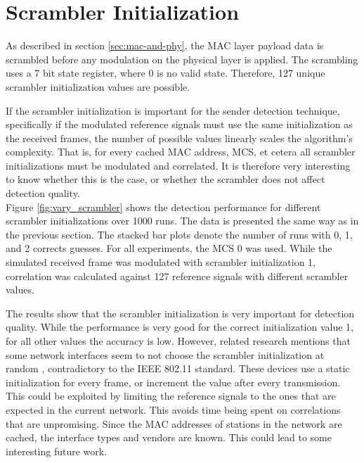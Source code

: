 
\section{Scrambler Initialization}\label{sec:ex-scrambler}

As described in section \ref{sec:mac-and-phy}, the \gls{MAC} layer payload data is scrambled before any modulation on the physical layer is applied. The scrambling uses a 7 bit state register, where 0 is no valid state. Therefore, 127 unique scrambler initialization values are possible.

If the scrambler initialization is important for the sender detection technique, specifically if the modulated reference signals must use the same initialization as the received frames, the number of possible values linearly scales the algorithm's complexity. That is, for every cached \gls{MAC} address, \gls{MCS}, et cetera all scrambler initializations must be modulated and correlated. It is therefore very interesting to know whether this is the case, or whether the scrambler does not affect detection quality.\\

Figure \ref{fig:vary_scrambler} shows the detection performance for different scrambler initializations over 1000 runs. The data is presented the same way as in the previous section. The stacked bar plots denote the number of runs with 0, 1, and 2 corrects guesses. For all experiments, the \gls{MCS} 0 was used. While the simulated received frame was modulated with scrambler initialization 1, correlation was calculated against 127 reference signals with different scrambler values.

The results show that the scrambler initialization is very important for detection quality. While the performance is very good for the correct initialization value 1, for all other values the accuracy is low. However, related research mentions that some network interfaces seem to not choose the scrambler initialization at random \cite{noubir2016}, contradictory to the IEEE 802.11 standard. These devices use a static initialization for every frame, or increment the value after every transmission. This could be exploited by limiting the reference signals to the ones that are expected in the current network. This avoids time being spent on correlations that are unpromising. Since the \gls{MAC} addresses of stations in the network are cached, the interface types and vendors are known. This could lead to some interesting future work.

